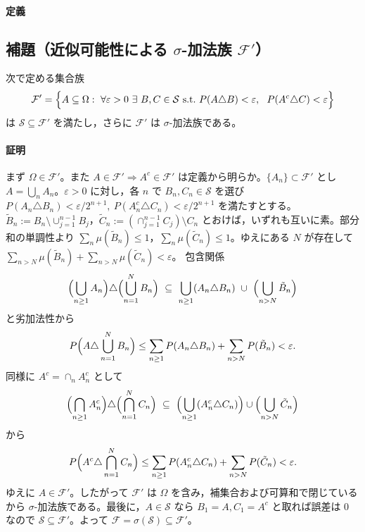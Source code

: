 \documentclass[uplatex,dvipdfmx,11pt,a4paper,openany]{bxjsbook}
\begin{document}
\paragraph{定義}
\subsection{補題（近似可能性による \(\sigma\)-加法族 \(\mathcal{F}'\)）}
次で定める集合族
                    \[\mathcal{F}'=\Bigl\{A\subseteq\Omega:\ \forall\varepsilon>0\ \exists\ B,C\in\mathcal{S}\ \text{s.t.}\ P(A\triangle B)<\varepsilon,\ \ P(A^c\triangle C)<\varepsilon\Bigr\}\]
                    は \(\mathcal{S}\subseteq\mathcal{F}'\) を満たし，さらに \(\mathcal{F}'\) は \(\sigma\)-加法族である。

\paragraph{証明}
まず \(\Omega\in\mathcal{F}'\)。また \(A\in\mathcal{F}'\Rightarrow A^c\in\mathcal{F}'\) は定義から明らか。\(\{A_n\}\subset\mathcal{F}'\) とし
                        \(A=\bigcup_n A_n\)。\(\varepsilon>0\) に対し，各 \(n\) で \(B_n,C_n\in\mathcal{S}\) を選び
                        \(P(A_n\triangle B_n)<\varepsilon/2^{n+1},\ P(A_n^c\triangle C_n)<\varepsilon/2^{n+1}\) を満たすとする。
                        \(\tilde B_n:=B_n\setminus \cup_{j=1}^{n-1}B_j\)，\(\tilde C_n:= (\cap_{j=1}^{n-1}C_j)\setminus C_n\) とおけば，いずれも互いに素。部分和の単調性より \(\sum_n \mu(\tilde B_n)\le1\)，\(\sum_n \mu(\tilde C_n)\le1\)。ゆえにある \(N\) が存在して
                        \(\sum_{n>N}\mu(\tilde B_n)+\sum_{n>N}\mu(\tilde C_n)<\varepsilon\)。
                        包含関係
                        \[\Bigl(\bigcup_{n\ge1}A_n\Bigr)\triangle \Bigl(\bigcup_{n=1}^N B_n\Bigr)\ \subseteq\ \bigcup_{n\ge1}(A_n\triangle B_n)\ \cup\ \Bigl(\bigcup_{n>N}\tilde B_n\Bigr)\]
                        と劣加法性から
                        \[P\Bigl(A\triangle \bigcup_{n=1}^N B_n\Bigr)\le \sum_{n\ge1}P(A_n\triangle B_n)+\sum_{n>N}P(\tilde B_n)<\varepsilon.\]
                        同様に \(A^c=\cap_n A_n^c\) として
                        \[\Bigl(\bigcap_{n\ge1}A_n^c\Bigr)\triangle \Bigl(\bigcap_{n=1}^N C_n\Bigr)\ \subseteq\ \Bigl(\bigcup_{n\ge1}(A_n^c\triangle C_n)\Bigr)\cup\Bigl(\bigcup_{n>N}\tilde C_n\Bigr)\]
                        から
                        \[P\Bigl(A^c\triangle \bigcap_{n=1}^N C_n\Bigr)\le \sum_{n\ge1}P(A_n^c\triangle C_n)+\sum_{n>N}P(\tilde C_n)<\varepsilon.\]
                        ゆえに \(A\in\mathcal{F}'\)。したがって \(\mathcal{F}'\) は \(\Omega\) を含み，補集合および可算和で閉じているから \(\sigma\)-加法族である。最後に，\(A\in\mathcal{S}\) なら \(B_1=A, C_1=A^c\) と取れば誤差は 0 なので \(\mathcal{S}\subseteq\mathcal{F}'\)。よって \(\mathcal{F}=\sigma(\mathcal{S})\subseteq\mathcal{F}'\)。
\end{document}
